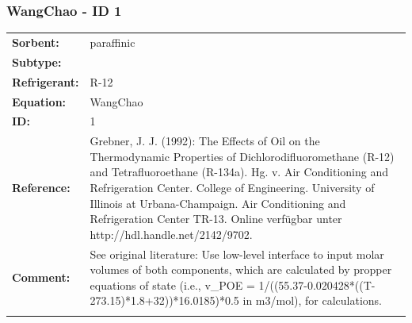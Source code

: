 \subsubsection{WangChao - ID 1}
%
\begin{tabular}[l]{|lp{11.5cm}|}
\hline
\addlinespace

\textbf{Sorbent:} & paraffinic \\
\textbf{Subtype:} &  \\
\textbf{Refrigerant:} & R-12 \\
\textbf{Equation:} & WangChao \\
\textbf{ID:} & 1 \\
\textbf{Reference:} & Grebner, J. J. (1992): The Effects of Oil on the Thermodynamic Properties of Dichlorodifluoromethane (R-12) and Tetrafluoroethane (R-134a). Hg. v. Air Conditioning and Refrigeration Center. College of Engineering. University of Illinois at Urbana-Champaign. Air Conditioning and Refrigeration Center TR-13. Online verfügbar unter http://hdl.handle.net/2142/9702. \\
\textbf{Comment:} & See original literature: Use low-level interface to input molar volumes of both components, which are calculated by propper equations of state (i.e., v\_POE =  1/((55.37-0.020428*((T-273.15)*1.8+32))*16.0185)*0.5 in m3/mol), for calculations. \\

\addlinespace
\hline
\end{tabular}
\newline

